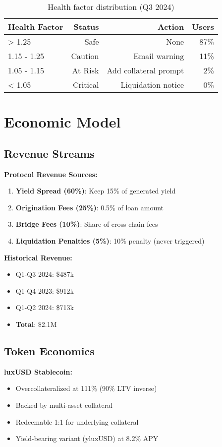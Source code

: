 \documentclass[11pt,a4paper]{article}
\begin{document}
\begin{table}[h]
\centering
\begin{tabular}{@{}lrrr@{}}
\toprule
\textbf{Health Factor} & \textbf{Status} & \textbf{Action} & \textbf{Users} \\ \midrule
> 1.25 & Safe & None & 87\% \\
1.15 - 1.25 & Caution & Email warning & 11\% \\
1.05 - 1.15 & At Risk & Add collateral prompt & 2\% \\
< 1.05 & Critical & Liquidation notice & 0\% \\ \bottomrule
\end{tabular}
\caption{Health factor distribution (Q3 2024)}
\end{table}

\section{Economic Model}

\subsection{Revenue Streams}

\textbf{Protocol Revenue Sources:}
\begin{enumerate}
\item \textbf{Yield Spread (60\%)}: Keep 15\% of generated yield
\item \textbf{Origination Fees (25\%)}: 0.5\% of loan amount
\item \textbf{Bridge Fees (10\%)}: Share of cross-chain fees
\item \textbf{Liquidation Penalties (5\%)}: 10\% penalty (never triggered)
\end{enumerate}

\textbf{Historical Revenue:}
\begin{itemize}
\item Q1-Q3 2024: \$487k
\item Q1-Q4 2023: \$912k
\item Q1-Q2 2024: \$713k
\item \textbf{Total}: \$2.1M
\end{itemize}

\subsection{Token Economics}

\textbf{luxUSD Stablecoin:}
\begin{itemize}
\item Overcollateralized at 111\% (90\% LTV inverse)
\item Backed by multi-asset collateral
\item Redeemable 1:1 for underlying collateral
\item Yield-bearing variant (yluxUSD) at 8.2\% APY
\end{itemize}
\end{document}
